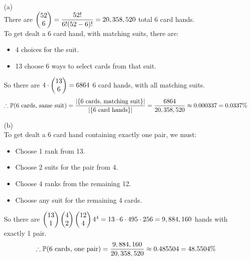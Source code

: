 \documentclass[a4paper,12pt]{report}
\begin{document}
\newpage
{}
\sol (a) \\
There are $\begin{pmatrix} 52 \\ 6 \end{pmatrix} = \dfrac{52!}{6!(52-6)!} = 20,358,520$ total 6 card hands. \\
To get dealt a 6 card hand, with matching suits, there are:
\begin{itemize}[itemsep=-1ex]
  \item 4 choices for the suit.
  \item 13 choose 6 ways to select cards from that suit.
\end{itemize}
So there are $4\cdot\begin{pmatrix} 13 \\ 6 \end{pmatrix}=6864$ 6 card hands, with all matching suits.
$$
  \therefore \mathbb{P}(\text{6 cards, same suit}) = \frac{\left| \left\lbrace \text{6 cards, matching suit} \right\rbrace \right|}{\left| \left\lbrace \text{6 card hands} \right\rbrace \right|} = \frac{6864}{20,358,520} \approx 0.000337 = 0.0337\%
$$

\sol (b) \\
To get dealt a 6 card hand containing exactly one pair, we must:
\begin{itemize}[itemsep=-1ex]
  \item Choose 1 rank from 13.
  \item Choose 2 suits for the pair from 4.
  \item Choose 4 ranks from the remaining 12.
  \item Choose any suit for the remaining 4 cards.
\end{itemize}
So there are $\begin{pmatrix} 13 \\ 1 \end{pmatrix}\begin{pmatrix} 4 \\ 2 \end{pmatrix}\begin{pmatrix} 12 \\ 4 \end{pmatrix}4^4 = 13\cdot6\cdot495\cdot256 = 9,884,160$ hands with exactly 1 pair.
$$
  \therefore\mathbb{P}(\text{6 cards, one pair}) = \frac{9,884,160}{20,358,520} \approx 0.485504 = 48.5504\%
$$
\end{document}
